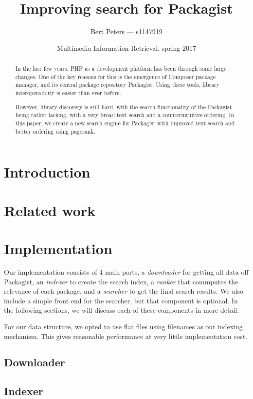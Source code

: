 \documentclass{article}
\title{Improving search for Packagist}
\author{Bert Peters --- s1147919}
\date{Multimedia Information Retrieval, spring 2017}
\begin{document}
\maketitle

\begin{abstract}
	In the last few years, PHP as a development platform has been through some large changes. One of the key reasons for this is the emergence of Composer package manager, and its central package repository Packagist. Using these tools, library interoperability is easier than ever before.

	However, library discovery is still hard, with the search functionality of the Packagist being rather lacking, with a very broad text search and a counterintuitive ordering. In this paper, we create a new search engine for Packagist with improved text search and better ordering using pagerank.
\end{abstract}

\section{Introduction}

\section{Related work}

\section{Implementation}

Our implementation consists of 4 main parts, a \emph{downloader} for getting all data off Packagist, an \emph{indexer} to create the search index, a \emph{ranker} that commputes the relevance of each package, and a \emph{searcher} to get the final search results. We also include a simple front end for the searcher, but that component is optional. In the following sections, we will discuss each of these components in more detail.

For our data structure, we opted to use flat files using filenames as our indexing mechanism. This gives reasonable performance at very little implementation cost.

\subsection{Downloader}

\subsection{Indexer}
\end{document}
